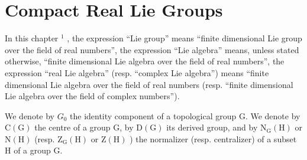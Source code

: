 \chapter{Compact Real Lie Groups}

In this chapter \(^{1}\) , the expression ``Lie group'' means ``finite dimensional Lie group over the field of real numbers'', the expression ``Lie algebra'' means, unless stated otherwise, ``finite dimensional Lie algebra over the field of real numbers'', the expression ``real Lie algebra'' (resp. ``complex Lie algebra'') means ``finite dimensional Lie algebra over the field of real numbers (resp. ``finite dimensional Lie algebra over the field of complex numbers'').

We denote by \(G_{0}\) the identity component of a topological group G. We denote by \(\mathrm{C(G)}\) the centre of a group G, by \(\mathrm{D(G)}\) its derived group, and by \(\mathrm{N_{G}(H)}\) or \(\mathrm{N(H)}\) (resp. \(\mathrm{Z_{G}(H)}\) or \(\mathrm{Z(H)}\) ) the normalizer (resp. centralizer) of a subset H of a group G.

